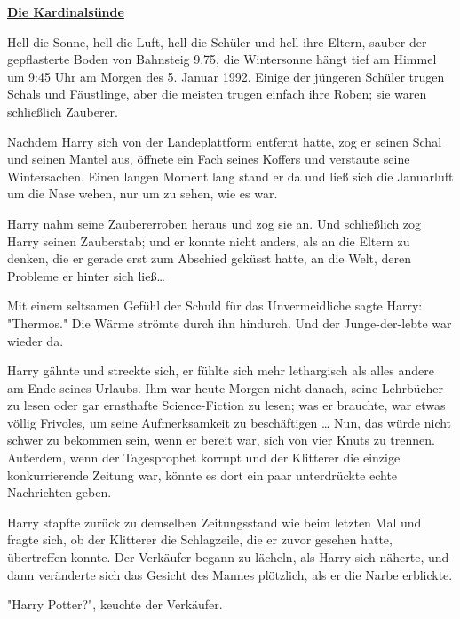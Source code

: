 

\hypertarget{die-kardinalsuxfcnde}{%

\textbf{\uline{Die Kardinalsünde}}

Hell die Sonne, hell die Luft, hell die Schüler und hell ihre Eltern, sauber der gepflasterte Boden von Bahnsteig 9.75, die Wintersonne hängt tief am Himmel um 9:45 Uhr am Morgen des 5. Januar 1992. Einige der jüngeren Schüler trugen Schals und Fäustlinge, aber die meisten trugen einfach ihre Roben; sie waren schließlich Zauberer.

Nachdem Harry sich von der Landeplattform entfernt hatte, zog er seinen Schal und seinen Mantel aus, öffnete ein Fach seines Koffers und verstaute seine Wintersachen. Einen langen Moment lang stand er da und ließ sich die Januarluft um die Nase wehen, nur um zu sehen, wie es war.

Harry nahm seine Zaubererroben heraus und zog sie an. Und schließlich zog Harry seinen Zauberstab; und er konnte nicht anders, als an die Eltern zu denken, die er gerade erst zum Abschied geküsst hatte, an die Welt, deren Probleme er hinter sich ließ…

Mit einem seltsamen Gefühl der Schuld für das Unvermeidliche sagte Harry: "Thermos." Die Wärme strömte durch ihn hindurch. Und der Junge-der-lebte war wieder da.

Harry gähnte und streckte sich, er fühlte sich mehr lethargisch als alles andere am Ende seines Urlaubs. Ihm war heute Morgen nicht danach, seine Lehrbücher zu lesen oder gar ernsthafte Science-Fiction zu lesen; was er brauchte, war etwas völlig Frivoles, um seine Aufmerksamkeit zu beschäftigen … Nun, das würde nicht schwer zu bekommen sein, wenn er bereit war, sich von vier Knuts zu trennen. Außerdem, wenn der Tagesprophet korrupt und der Klitterer die einzige konkurrierende Zeitung war, könnte es dort ein paar unterdrückte echte Nachrichten geben.

Harry stapfte zurück zu demselben Zeitungsstand wie beim letzten Mal und fragte sich, ob der Klitterer die Schlagzeile, die er zuvor gesehen hatte, übertreffen konnte. Der Verkäufer begann zu lächeln, als Harry sich näherte, und dann veränderte sich das Gesicht des Mannes plötzlich, als er die Narbe erblickte.

"Harry Potter?", keuchte der Verkäufer.

}
